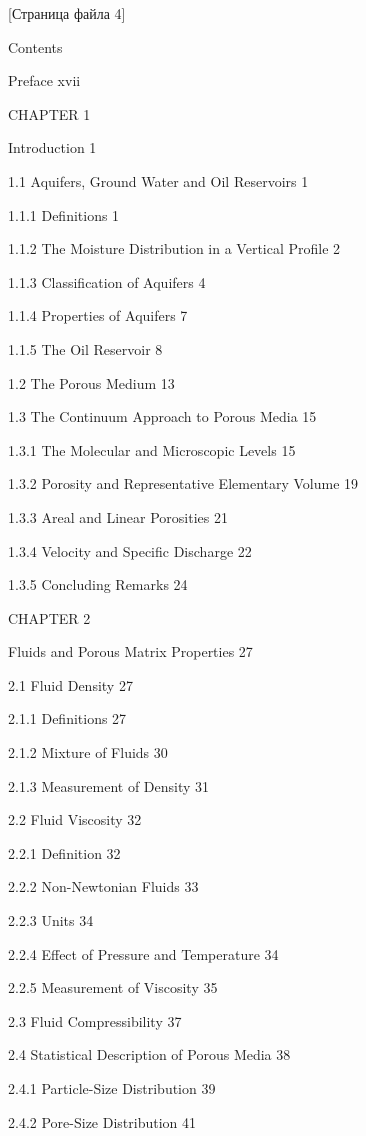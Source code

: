 \documentclass[
  11pt,
]{article}
\begin{document}
\begingroup\small\setlength{\parindent}{0pt}\setlength{\parskip}{1pt}
{[}Страница файла 4{]}\par
Contents \par
Preface xvii \par
CHAPTER 1 \par
Introduction 1 \par
1.1 Aquifers, Ground Water and Oil Reservoirs 1 \par
1.1.1 Definitions 1 \par
1.1.2 The Moisture Distribution in a Vertical Profile 2 \par
1.1.3 Classification of Aquifers 4 \par
1.1.4 Properties of Aquifers 7 \par
1.1.5 The Oil Reservoir 8 \par
1.2 The Porous Medium 13 \par
1.3 The Continuum Approach to Porous Media 15 \par
1.3.1 The Molecular and Microscopic Levels 15 \par
1.3.2 Porosity and Representative Elementary Volume 19 \par
1.3.3 Areal and Linear Porosities 21 \par
1.3.4 Velocity and Specific Discharge 22 \par
1.3.5 Concluding Remarks 24 \par
CHAPTER 2 \par
Fluids and Porous Matrix Properties 27 \par
2.1 Fluid Density 27 \par
2.1.1 Definitions 27 \par
2.1.2 Mixture of Fluids 30 \par
2.1.3 Measurement of Density 31 \par
2.2 Fluid Viscosity 32 \par
2.2.1 Definition 32 \par
2.2.2 Non-Newtonian Fluids 33 \par
2.2.3 Units 34 \par
2.2.4 Effect of Pressure and Temperature 34 \par
2.2.5 Measurement of Viscosity 35 \par
2.3 Fluid Compressibility 37 \par
2.4 Statistical Description of Porous Media 38 \par
2.4.1 Particle-Size Distribution 39 \par
2.4.2 Pore-Size Distribution 41 \par
\end{document}
